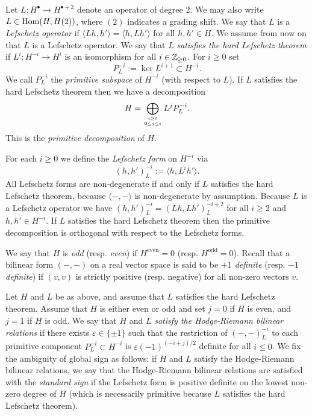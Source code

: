 \documentclass[11pt]{amsart}
\numberwithin{equation}{section}
\def\e{\varepsilon}
\def\to{\rightarrow}
\theoremstyle{definition}
\theoremstyle{remark}
\begin{document}
Let $L \colon H^\bullet \to H^{\bullet + 2}$ denote an operator of degree 2. We may also write $L \in \operatorname{Hom}(H,H(2))$, where $(2)$ indicates a grading shift. We say that $L$ is a
\emph{Lefschetz operator} if $\langle Lh, h' \rangle = \langle h, Lh'
\rangle$ for all $h, h' \in H$. We assume from now on that $L$ is a
Lefschetz operator. We say that $L$ \emph{satisfies
  the hard Lefschetz theorem} if $L^i : H^{-i} \to 
H^{i}$ is an isomorphism for all $i \in {\mathbb{Z}}_{\ge 0}$. For $i \ge 0$
set \[ P^{-i}_L := \ker L^{i+1} \subset H^{-i}. \] We call $P^{-i}_L$
the \emph{primitive subspace} of $H^{-i}$ (with 
respect to $L$). If $L$ satisfies the hard Lefschetz theorem then we
have a decomposition \[ H = \bigoplus_{i \ge 0 \atop 0 \le j
  \le i} L^j P_L^{-i}. \] This is the 
\emph{primitive decomposition} of $H$.

For each $i \ge 0$ we define the \emph{Lefschetz form} on $H^{-i}$
via \[ (h,h')^{-i}_L := \langle h, L^i h' \rangle. \] All Lefschetz
forms are non-degenerate if and only if $L$ satisfies the hard
Lefschetz theorem, because $\langle -, - \rangle$ is non-degenerate by
assumption. Because $L$ is a Lefschetz operator we have $(h,h')^{-i}_L =
(Lh,Lh')^{-i+2}_L$ for all $i \ge 2$ and $h, h' \in H^{-i}$. If $L$ satisfies the hard Lefschetz theorem then the primitive
decomposition is orthogonal with respect to the Lefschetz forms.

We say that $H$ is \emph{odd} (resp. \emph{even}) if
$H^\textrm{even} = 0$ (resp. $H^\textrm{odd} = 0$). Recall that a
bilinear form $(-,-)$ on a real vector space is said to be
\emph{$+1$ definite} (resp. \emph{$-1$ definite}) if $(v,v)$ is strictly positive (resp. negative) for all non-zero vectors $v$.

Let $H$ and $L$ be as above, and assume that $L$ satisfies the hard Lefschetz theorem. Assume that $H$ is either even or odd and set $j = 0$ if $H$ is even,
and $j = 1$ if $H$ is odd. We say that $H$ and $L$ \emph{satisfy the Hodge-Riemann bilinear relations} if there exists $\e \in \{\pm 1\}$ such that the restriction of
$(-,-)^{-i}_L$ to each primitive component $P_L^{-i} \subset H^{-i}$
is $\e(-1)^{(-i+j)/2}$ definite for all $i \le 0$. We fix the
ambiguity of global sign as follows: if $H$ and $L$ satisfy 
the Hodge-Riemann bilinear relations, we say that the
Hodge-Riemann bilinear relations are satisfied with the \emph{standard
  sign} if the Lefschetz form is positive definite on the lowest
non-zero degree of $H$ (which is necessarily primitive because
$L$ satisfies the hard Lefschetz theorem).
\end{document}
